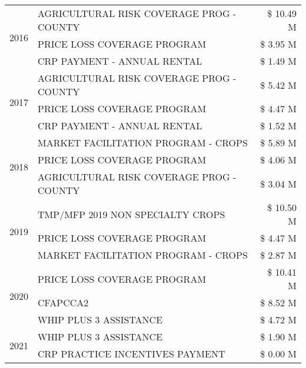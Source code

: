 \begin{tabular}{llr}
\multirow[t]{3}{*}{2016} & AGRICULTURAL RISK COVERAGE PROG - COUNTY & \$ 10.49 M \\
 & PRICE LOSS COVERAGE PROGRAM & \$ 3.95 M \\
 & CRP PAYMENT - ANNUAL RENTAL & \$ 1.49 M \\
\cline{1-3}
\multirow[t]{3}{*}{2017} & AGRICULTURAL RISK COVERAGE PROG - COUNTY & \$ 5.42 M \\
 & PRICE LOSS COVERAGE PROGRAM & \$ 4.47 M \\
 & CRP PAYMENT - ANNUAL RENTAL & \$ 1.52 M \\
\cline{1-3}
\multirow[t]{3}{*}{2018} & MARKET FACILITATION PROGRAM - CROPS & \$ 5.89 M \\
 & PRICE LOSS COVERAGE PROGRAM & \$ 4.06 M \\
 & AGRICULTURAL RISK COVERAGE PROG - COUNTY & \$ 3.04 M \\
\cline{1-3}
\multirow[t]{3}{*}{2019} & TMP/MFP 2019 NON SPECIALTY CROPS & \$ 10.50 M \\
 & PRICE LOSS COVERAGE PROGRAM & \$ 4.47 M \\
 & MARKET FACILITATION PROGRAM - CROPS & \$ 2.87 M \\
\cline{1-3}
\multirow[t]{3}{*}{2020} & PRICE LOSS COVERAGE PROGRAM & \$ 10.41 M \\
 & CFAPCCA2 & \$ 8.52 M \\
 & WHIP PLUS 3 ASSISTANCE & \$ 4.72 M \\
\cline{1-3}
\multirow[t]{2}{*}{2021} & WHIP PLUS 3 ASSISTANCE & \$ 1.90 M \\
 & CRP PRACTICE INCENTIVES PAYMENT & \$ 0.00 M \\
\cline{1-3}
\bottomrule
\end{tabular}
